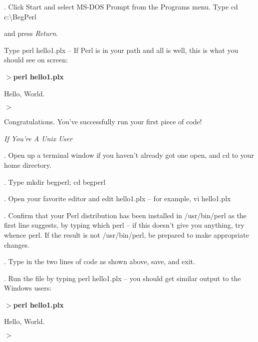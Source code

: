 \documentclass[a4paper,11pt]{book}
\begin{document}
\noindent 

.   Click Start and select MS-DOS Prompt from the Programs menu. Type cd c:\textbackslash BegPerl

\noindent and press \textit{Return}.

\noindent 

\noindent Type perl hello1.plx -- If Perl is in your path and all is well, this is what you should see on screen:

\noindent 

\noindent $>$\textbf{perl hello1.plx}

\noindent Hello, World.

\noindent 

\noindent $>$

\noindent 

\noindent Congratulations. You've successfully run your first piece of code!

\noindent 

\noindent \textit{If You're A Unix User}

.   Open up a terminal window if you haven't already got one open, and cd to your home directory.

\noindent 

.   Type mkdir begperl; cd begperl

\noindent 

.   Open your favorite editor and edit hello1.plx -- for example, vi hello1.plx

\noindent 

.   Confirm that your Perl distribution has been installed in /usr/bin/perl as the first line suggests, by typing which perl -- if this doesn't give you anything, try whence perl. If the result is not /usr/bin/perl, be prepared to make appropriate changes.

\noindent 

.   Type in the two lines of code as shown above, save, and exit.

\noindent 

.   Run the file by typing perl hello1.plx -- you should get similar output to the Windows users:

\noindent 

\noindent $>$\textbf{perl hello1.plx}

\noindent Hello, World.

\noindent $>$

\noindent 
\end{document}

